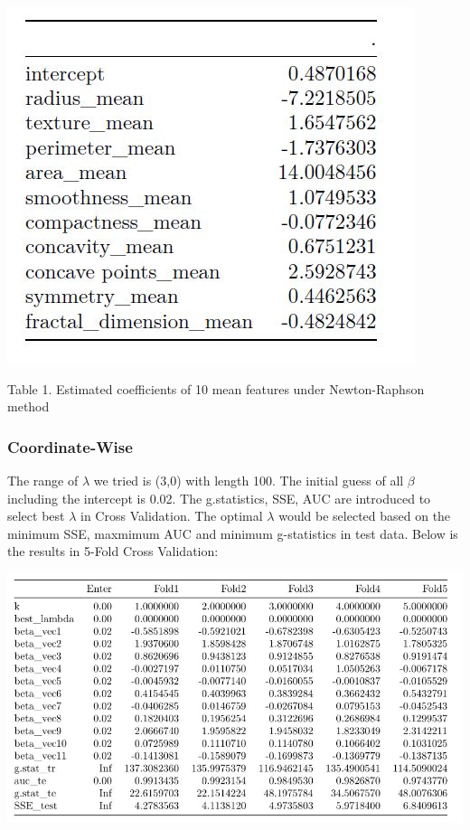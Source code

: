 \documentclass[]{article}
\begin{document}
\begin{center}
\includegraphics{./results/NR.JPG}
\end{center}

\begin{center}
Table 1. Estimated coefficients of 10 mean features under Newton-Raphson method
\end{center}

\hypertarget{coordinate-wise}{%
\subsubsection{Coordinate-Wise}\label{coordinate-wise}}

The range of \(\lambda\) we tried is (3,0) with length 100. The initial
guess of all \(\beta\) including the intercept is 0.02. The
g.statistics, SSE, AUC are introduced to select best \(\lambda\) in
Cross Validation. The optimal \(\lambda\) would be selected based on the
minimum SSE, maxmimum AUC and minimum g-statistics in test data. Below
is the results in 5-Fold Cross Validation:

\begin{center}
\includegraphics{./results/Results from Yuqi.JPG}
\end{center}
\end{document}
